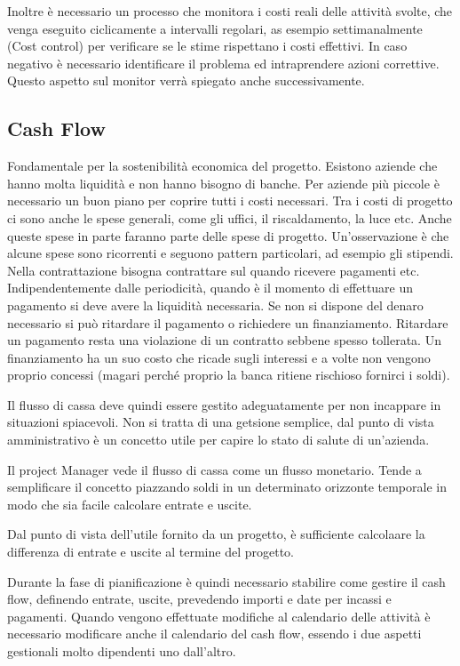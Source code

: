 \noindent Inoltre è necessario un processo che monitora i costi reali delle attività svolte, che venga eseguito ciclicamente a intervalli regolari, as esempio settimanalmente (Cost control) per verificare se le stime rispettano i costi effettivi. In caso negativo è necessario identificare il problema ed intraprendere azioni correttive. Questo aspetto sul monitor verrà spiegato anche successivamente.
\subsection{Cash Flow}
Fondamentale per la sostenibilità economica del progetto. Esistono aziende che hanno molta liquidità e non hanno bisogno di banche. Per aziende più piccole è necessario un buon piano per coprire tutti i costi necessari. Tra i costi di progetto ci sono anche le spese generali, come gli uffici, il riscaldamento, la luce etc.
Anche queste spese in parte faranno parte delle spese di progetto. Un'osservazione è che alcune spese sono ricorrenti e seguono pattern particolari, ad esempio gli stipendi. Nella contrattazione bisogna contrattare sul quando ricevere pagamenti etc.
Indipendentemente dalle periodicità, quando è il momento di effettuare un pagamento si deve avere la liquidità necessaria. Se non si dispone del denaro necessario si può ritardare il pagamento o richiedere un finanziamento. Ritardare un pagamento resta una violazione di un contratto sebbene spesso tollerata. Un finanziamento ha un suo costo che ricade sugli interessi e a volte non vengono proprio concessi (magari perché proprio la banca ritiene rischioso fornirci i soldi).

\noindent Il flusso di cassa deve quindi essere gestito adeguatamente per non incappare in situazioni spiacevoli. Non si tratta di una getsione semplice, dal punto di vista amministrativo è un concetto utile per capire lo stato di salute di un'azienda.

\noindent Il project Manager vede il flusso di cassa come un flusso monetario. Tende a semplificare il concetto piazzando soldi in un determinato orizzonte temporale in modo che sia facile calcolare entrate e uscite.

\noindent Dal punto di vista dell'utile fornito da un progetto, è sufficiente calcolaare la differenza di entrate e uscite al termine del progetto.

\noindent Durante la fase di pianificazione è quindi necessario stabilire come gestire il cash flow, definendo entrate, uscite, prevedendo importi e date per incassi e pagamenti. Quando vengono effettuate modifiche al calendario delle attività è necessario modificare anche il calendario del cash flow, essendo i due aspetti gestionali molto dipendenti uno dall'altro.


